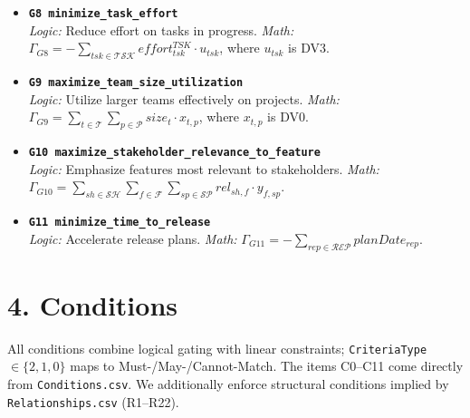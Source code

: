 \documentclass[11pt,a4paper]{article}
\begin{document}
\begin{itemize}[leftmargin=2em]
  \item \textbf{\texttt{G8 minimize\_task\_effort}} \\
    \textit{Logic:} Reduce effort on tasks in progress. \quad
    \textit{Math:} $\Gamma_{G8} = - \sum_{tsk\in\mathcal{TSK}} effort^{TSK}_{tsk}\cdot u_{tsk}$, where $u_{tsk}$ is DV3.

  \item \textbf{\texttt{G9 maximize\_team\_size\_utilization}} \\
    \textit{Logic:} Utilize larger teams effectively on projects. \quad
    \textit{Math:} $\Gamma_{G9} = \sum_{t\in\mathcal{T}}\sum_{p\in\mathcal{P}} size_t \cdot x_{t,p}$, where $x_{t,p}$ is DV0.

  \item \textbf{\texttt{G10 maximize\_stakeholder\_relevance\_to\_feature}} \\
    \textit{Logic:} Emphasize features most relevant to stakeholders. \quad
    \textit{Math:} $\Gamma_{G10} = \sum_{sh\in\mathcal{SH}}\sum_{f\in\mathcal{F}}\sum_{sp\in\mathcal{SP}} rel_{sh,f}\cdot y_{f,sp}$.

  \item \textbf{\texttt{G11 minimize\_time\_to\_release}} \\
    \textit{Logic:} Accelerate release plans. \quad
    \textit{Math:} $\Gamma_{G11} = - \sum_{rep\in\mathcal{REP}} planDate_{rep}$.
\end{itemize}

\section{4. Conditions}
\noindent All conditions combine logical gating with linear constraints; \texttt{CriteriaType} $\in\{2,1,0\}$ maps to Must-/May-/Cannot-Match. The items C0--C11 come directly from \texttt{Conditions.csv}. We additionally enforce structural conditions implied by \texttt{Relationships.csv} (R1--R22).
\end{document}
